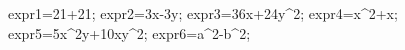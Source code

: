 \documentclass[exercice]{thedocument}%
\begin{document}
%
    \>expr1=21+21;%
    \>expr2=3x-3y;%
    \>expr3=36x+24y^2;%
    \>expr4=x^2+x;%
    \>expr5=5x^2y+10xy^2;%
    \>expr6=a^2-b^2;%
\end{document}
